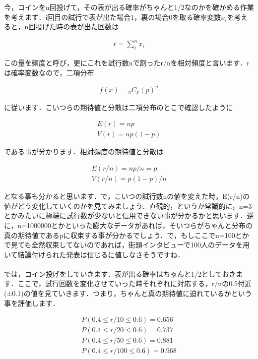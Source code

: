 \documentclass[11pt,a4paper,uplatex]{ujreport} 	%
\begin{document}
今，コインをn回投げて，その表が出る確率がちゃんと1/2なのかを確かめる作業を考えます．i回目の試行で表が出た場合1，裏の場合0を取る確率変数$x_i$を考えると，n回投げた時の表が出た回数は

\begin{align}
  r = \sum_i^n x_i
\end{align}

この量を頻度と呼び，更にこれを試行数nで割ったr/nを相対頻度と言います．rは確率変数なので，二項分布

\begin{align}
  f(x) = {}_n C_x (p)^n
\end{align}


に従います．こいつらの期待値と分散は二項分布のとこで確認したように

\begin{align}
  E(r) = np\\
  V(r) = np(1-p)
\end{align}

である事が分かります．相対頻度の期待値と分散は

\begin{align}
  E(r/n) = np/n = p\\
  V(r/n) = p(1-p)/n
\end{align}

となる事も分かると思います．で，こいつの試行数nの値を変えた時，E(r/n)の値がどう変化していくのかを見てみましょう．直観的，というか常識的に，n=3とかみたいに極端に試行数が少ないと信用できない事が分かるかと思います．逆に，n=1000000とかといった膨大なデータがあれば，そいつらがちゃんと分布の真の期待値であるpに収束する事が分かるでしょう．で，もしここでn=100とかで見ても全然収束してないのであれば，街頭インタビューで100人のデータを用いて結論付けられた発表は信じるに値しなさそうですね．\\
\\

では，コイン投げをしていきます．表が出る確率はちゃんと1/2としておきます．ここで，試行回数を変化させていった時それぞれに対応する，r/nの0.5付近(±0.1)の値を見ていきます．つまり，ちゃんと真の期待値に迫れているかという事を評価します．

\begin{align}
  P(0.4 \leq r/10 \leq 0.6) = 0.656\\
  P(0.4 \leq r/20 \leq 0.6) = 0.737\\
  P(0.4 \leq r/50 \leq 0.6) = 0.881\\
  P(0.4 \leq r/100 \leq 0.6) = 0.968
\end{align}
\end{document}

